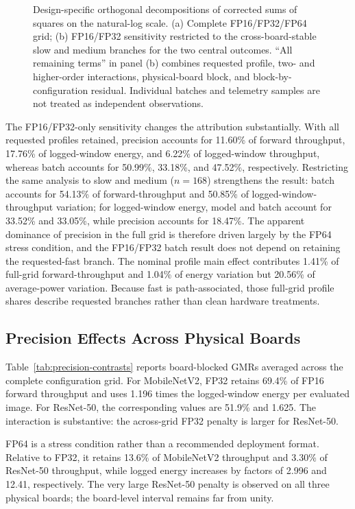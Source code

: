 \documentclass[electronics,article,submit,pdftex,moreauthors]{Definitions/mdpi}
\newcommand{\mobile}{MobileNetV2}
\newcommand{\resnet}{ResNet-50}
\renewcommand{\tabref}[1]{Table~\ref{#1}}
\begin{document}
\begin{figure}[t]
\centering
\resizebox{\linewidth}{!}{}
\caption{Design-specific orthogonal decompositions of corrected sums of squares on the natural-log scale. (a) Complete FP16/FP32/FP64 grid; (b) FP16/FP32 sensitivity restricted to the cross-board-stable slow and medium branches for the two central outcomes. ``All remaining terms'' in panel (b) combines requested profile, two- and higher-order interactions, physical-board block, and block-by-configuration residual. Individual batches and telemetry samples are not treated as independent observations.}
\label{fig:variance}
\end{figure}

The FP16/FP32-only sensitivity changes the attribution substantially. With all requested profiles retained, precision accounts for 11.60\% of forward throughput, 17.76\% of logged-window energy, and 6.22\% of logged-window throughput, whereas batch accounts for 50.99\%, 33.18\%, and 47.52\%, respectively. Restricting the same analysis to slow and medium ($n=168$) strengthens the result: batch accounts for 54.13\% of forward-throughput and 50.85\% of logged-window-throughput variation; for logged-window energy, model and batch account for 33.52\% and 33.05\%, while precision accounts for 18.47\%. The apparent dominance of precision in the full grid is therefore driven largely by the FP64 stress condition, and the FP16/FP32 batch result does not depend on retaining the requested-fast branch. The nominal profile main effect contributes 1.41\% of full-grid forward-throughput and 1.04\% of energy variation but 20.56\% of average-power variation. Because fast is path-associated, those full-grid profile shares describe requested branches rather than clean hardware treatments.

\subsection{Precision Effects Across Physical Boards}

\tabref{tab:precision-contrasts} reports board-blocked GMRs averaged across the complete configuration grid. For \mobile{}, FP32 retains 69.4\% of FP16 forward throughput and uses 1.196 times the logged-window energy per evaluated image. For \resnet{}, the corresponding values are 51.9\% and 1.625. The interaction is substantive: the across-grid FP32 penalty is larger for \resnet{}.

FP64 is a stress condition rather than a recommended deployment format. Relative to FP32, it retains 13.6\% of \mobile{} throughput and 3.30\% of \resnet{} throughput, while logged energy increases by factors of 2.996 and 12.41, respectively. The very large \resnet{} penalty is observed on all three physical boards; the board-level interval remains far from unity.
\end{document}

